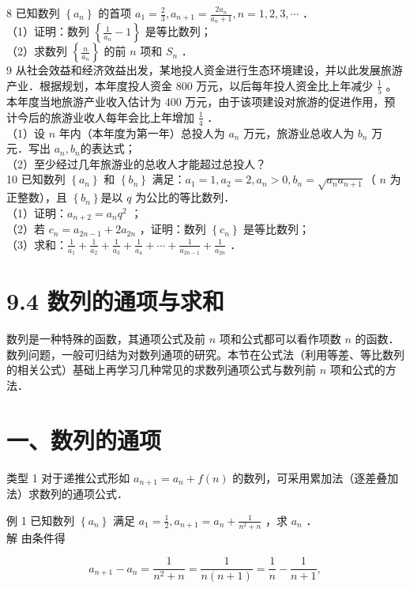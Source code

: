 \documentclass[10pt]{article}
\begin{document}
8 已知数列 \(\left\{a_{n}\right\}\) 的首项 \(a_{1}=\frac{2}{3}, a_{n+1}=\frac{2 a_{n}}{a_{n}+1}, n=1,2,3, \cdots\) ．\\
（1）证明：数列 \(\left\{\frac{1}{a_{n}}-1\right\}\) 是等比数列；\\
（2）求数列 \(\left\{\frac{n}{a_{n}}\right\}\) 的前 \(n\) 项和 \(S_{n}\) ．\\
9 从社会效益和经济效益出发，某地投人资金进行生态环境建设，并以此发展旅游产业．根据规划，本年度投人资金 800 万元，以后每年投人资金比上年减少 \(\frac{1}{5}\) 。本年度当地旅游产业收入估计为 400 万元，由于该项建设对旅游的促进作用，预计今后的旅游业收人每年会比上年增加 \(\frac{1}{4}\) ．\\
（1）设 \(n\) 年内（本年度为第一年）总投人为 \(a_{n}\) 万元，旅游业总收人为 \(b_{n}\) 万元．写出 \(a_{n}, b_{n}\)的表达式；\\
（2）至少经过几年旅游业的总收人才能超过总投人？\\
10 已知数列 \(\left\{a_{n}\right\}\) 和 \(\left\{b_{n}\right\}\) 满足：\(a_{1}=1, a_{2}=2, a_{n}>0, b_{n}=\sqrt{a_{n} a_{n+1}}\)（ \(n\) 为正整数），且 \(\left\{b_{n}\right\}\)是以 \(q\) 为公比的等比数列．\\
（1）证明：\(a_{n+2}=a_{n} q^{2}\) ；\\
（2）若 \(c_{n}=a_{2 n-1}+2 a_{2 n}\) ，证明：数列 \(\left\{c_{n}\right\}\) 是等比数列；\\
（3）求和：\(\frac{1}{a_{1}}+\frac{1}{a_{2}}+\frac{1}{a_{3}}+\frac{1}{a_{4}}+\cdots+\frac{1}{a_{2 n-1}}+\frac{1}{a_{2 n}}\) ．

\section*{9.4 数列的通项与求和}
数列是一种特殊的函数，其通项公式及前 \(n\) 项和公式都可以看作项数 \(n\) 的函数．数列问题，一般可归结为对数列通项的研究。本节在公式法（利用等差、等比数列的相关公式）基础上再学习几种常见的求数列通项公式与数列前 \(n\) 项和公式的方法．

\section*{一、数列的通项}
类型 1 对于递推公式形如 \(a_{n+1}=a_{n}+f(n)\) 的数列，可采用累加法（逐差叠加法）求数列的通项公式．

例 1 已知数列 \(\left\{a_{n}\right\}\) 满足 \(a_{1}=\frac{1}{2}, a_{n+1}=a_{n}+\frac{1}{n^{2}+n}\) ，求 \(a_{n}\) ．\\
解 由条件得

\[
a_{n+1}-a_{n}=\frac{1}{n^{2}+n}=\frac{1}{n(n+1)}=\frac{1}{n}-\frac{1}{n+1},
\]
\end{document}
